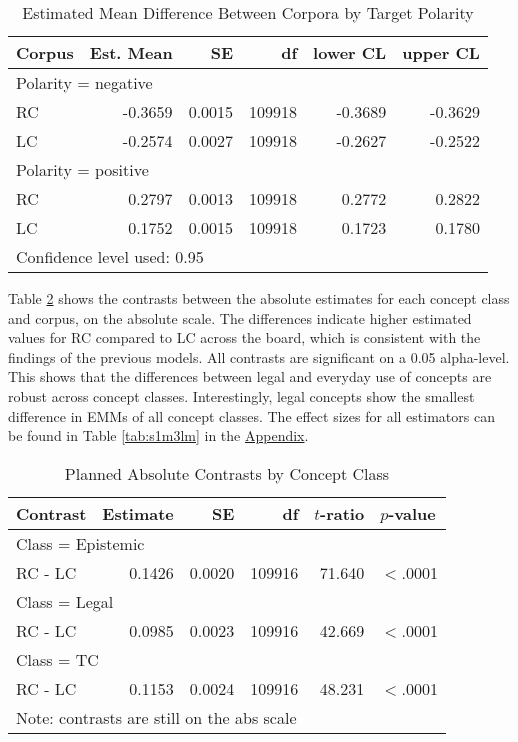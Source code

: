 \documentclass{article}
\begin{document}
\begin{table}[!h]
\centering
\begin{tabular}{lrrrrr}
  \hline
Corpus & Est. Mean & SE & df & lower CL & upper CL \\ 
\hline
\multicolumn{6}{l}{Polarity = negative}\\
\cmidrule{1-2}
RC & -0.3659 & 0.0015 & 109918 & -0.3689 & -0.3629 \\ 
  LC & -0.2574 & 0.0027 & 109918 & -0.2627 & -0.2522 \\ 
   \cmidrule{1-6}
\multicolumn{6}{l}{Polarity = positive}\\
\cmidrule{1-2}
RC & 0.2797 & 0.0013 & 109918 & 0.2772 & 0.2822 \\ 
  LC & 0.1752 & 0.0015 & 109918 & 0.1723 & 0.1780 \\ 
   \hline
\multicolumn{6}{l}{{\footnotesize Confidence level used: 0.95}}\\
\end{tabular}
\caption{Estimated Mean Difference Between Corpora by Target Polarity}
\label{tab:s1m2}
\end{table}

Table \ref{tab:s1m3} shows the contrasts between the absolute estimates for each concept class and corpus, on the absolute scale. The differences indicate higher estimated values for RC compared to LC across the board, which is consistent with the findings of the previous models. All contrasts are significant on a 0.05 alpha-level. This shows that the differences between legal and everyday use of concepts are robust across concept classes. Interestingly, legal concepts show the smallest difference in EMMs of all concept classes. The effect sizes for all estimators can be found in Table \ref{tab:s1m3lm} in the \hyperref[sec:appendix]{Appendix}. 

\begin{table}[ht]
\centering
\begin{tabular}{lrrrrl}
  \hline
Contrast & Estimate & SE & df & $t$-ratio & $p$-value \\ 
  \hline
\multicolumn{6}{l}{Class = Epistemic}\\
RC - LC & 0.1426 & 0.0020 & 109916 & 71.640 & $<$.0001 \\ 
\cmidrule{1-1}
\multicolumn{6}{l}{Class = Legal}\\
RC - LC & 0.0985 & 0.0023 & 109916 & 42.669 & $<$.0001 \\ 
\cmidrule{1-1}
\multicolumn{6}{l}{Class = TC}\\
RC - LC & 0.1153 & 0.0024 & 109916 & 48.231 & $<$.0001 \\ 
   \hline
\multicolumn{6}{l}{{\footnotesize Note: contrasts are still on the abs scale}}\\
\end{tabular}
\caption{Planned Absolute Contrasts by Concept Class}
\label{tab:s1m3}
\end{table}
\end{document}
